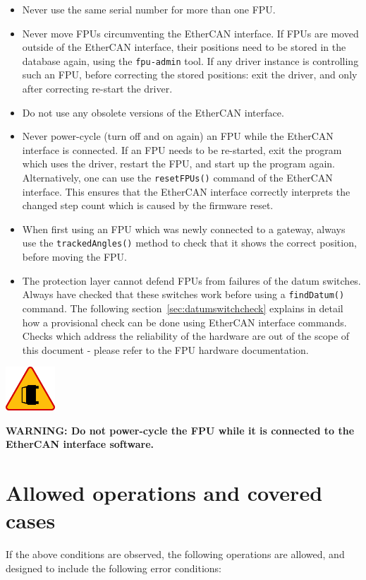 \documentclass[fontsize=12,a4paper]{scrreprt}
\newenvironment{warning}{\begin{framed}\includegraphics[width=5em]{accident-area-ahead.png}
}{\end{framed}}
\begin{document}
\begin{itemize}
  \item Never use the same serial number for more than one FPU.
  \item Never move FPUs circumventing the EtherCAN interface. If FPUs are moved
    outside of the EtherCAN interface, their positions need to be stored in the
    database again, using the \texttt{fpu-admin} tool. If any driver
    instance is controlling such an FPU, before correcting the stored
    positions: exit the driver, and only after correcting re-start the
    driver.

  \item Do not use any obsolete versions of the EtherCAN interface.

  \item Never power-cycle (turn off and on again) an FPU while the
    EtherCAN interface is connected. If an FPU needs to be re-started, exit the
    program which uses the driver, restart the FPU, and start up the
    program again.  Alternatively, one can use the
    \texttt{resetFPUs()} command of the EtherCAN interface. This ensures that the
    EtherCAN interface correctly interprets the changed step count which is caused
    by the firmware reset.
  \item When first using an FPU which was newly connected to a
    gateway, always use the \texttt{trackedAngles()} method to check
    that it shows the correct position, before moving the FPU.
  \item The protection layer cannot defend FPUs from failures of the
    datum switches. Always have checked that these switches work
    before using a \texttt{findDatum()} command. The following
    section~\ref{sec:datumswitchcheck} explains in detail how a
    provisional check can be done using EtherCAN interface commands. Checks which
    address the reliability of the hardware are out of the scope of
    this document - please refer to the FPU hardware documentation.
\end{itemize}

\begin{warning}
  \textbf{WARNING: Do not power-cycle the FPU while it is connected
    to the EtherCAN interface software.}
\end{warning}


\section{Allowed operations and covered cases}
If the above conditions are observed, the following operations are
allowed, and designed to include the following error conditions:
\end{document}

